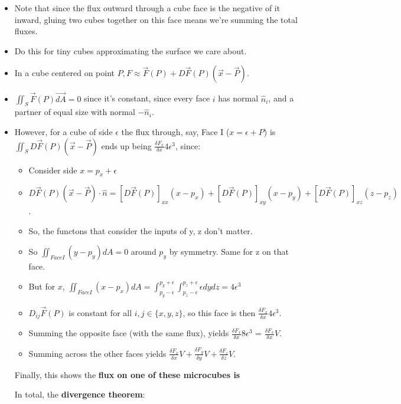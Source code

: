 \documentclass[11pt, oneside]{article}   	%
\begin{document}
\begin{itemize}
\item Note that since the flux outward through a cube face is the negative of it inward, gluing two cubes together on this face means we're summing the total fluxes.
\item Do this for tiny cubes approximating the surface we care about.
\item In a cube centered on point $P, F \approx \vec{F}(P) + D\vec{F}(P)(\vec{x} - \vec{P})$.
\item $\iint_S \vec{F}(P)\vec{dA} = 0$ since it's constant, since every face $i$ has normal $\hat{n}_i$, and a partner of equal size with normal $-\hat{n}_i$.
\item However,  for a cube of side $\epsilon$ the flux through, say, Face I ($x = \epsilon + P$) is  $\iint_S  D\vec{F}(P)(\vec{x} - \vec{P})$ ends up being $\frac{\delta F_x}{\delta x} 4 \epsilon^3$, since:
\begin{itemize}
\item Consider side $x = p_x + \epsilon$
\item $D\vec{F}(P)(\vec{x} - \vec{P}) \cdot \hat{n} =  [D\vec{F}(P)]_{xx} (x - p_x) + [D\vec{F}(P)]_{xy} (x - p_y) + [D\vec{F}(P)]_{xz} (z - p_z)$.
\item So, the functons that consider the inputs of y, z don't matter.
\item So $\iint_{Face I} (y - p_y)dA = 0$  around $p_y$ by symmetry.  Same for z on that face.
\item But for $x$, $\iint_{Face I} (x - p_x)dA = \int_{p_y - \epsilon}^{p_y + \epsilon} \int_{p_z - \epsilon}^{p_z + \epsilon}  \epsilon dy dz = 4 \epsilon^3$ 
\item $D_{ij}\vec{F}(P)$ is constant for all $i, j \in \{x, y, z\}$, so this face is then $\frac{\delta F_x}{\delta x} 4 \epsilon^3$.
\item Summing the opposite face (with the same flux), yields $\frac{\delta F_x}{\delta x} 8 \epsilon^3$ = $\frac{\delta F_x}{\delta x} V$.
\item Summing across the other faces yields $\frac{\delta F_x}{\delta x} V + \frac{\delta F_y}{\delta y} V + \frac{\delta F_z}{\delta z} V$.
\end{itemize}

Finally, this shows the \textbf{flux on one of these microcubes is} 

In total, the \textbf{divergence theorem}: 

\end{itemize}
\end{document}
